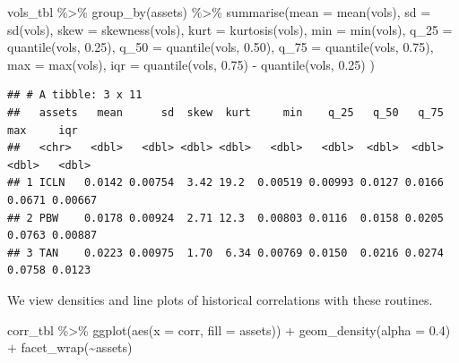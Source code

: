 \documentclass{article}
\newenvironment{Shaded}{\begin{snugshade}}{\end{snugshade}}
\newcommand{\AttributeTok}[1]{\textcolor[rgb]{0.77,0.63,0.00}{#1}}
\newcommand{\FloatTok}[1]{\textcolor[rgb]{0.00,0.00,0.81}{#1}}
\newcommand{\FunctionTok}[1]{\textcolor[rgb]{0.00,0.00,0.00}{#1}}
\newcommand{\NormalTok}[1]{#1}
\newcommand{\SpecialCharTok}[1]{\textcolor[rgb]{0.00,0.00,0.00}{#1}}
\begin{document}
\begin{Shaded}
\begin{Highlighting}[]
\NormalTok{vols\_tbl }\SpecialCharTok{\%\textgreater{}\%} \FunctionTok{group\_by}\NormalTok{(assets) }\SpecialCharTok{\%\textgreater{}\%} 
  \FunctionTok{summarise}\NormalTok{(}\AttributeTok{mean =} \FunctionTok{mean}\NormalTok{(vols), }
            \AttributeTok{sd =} \FunctionTok{sd}\NormalTok{(vols), }
            \AttributeTok{skew =} \FunctionTok{skewness}\NormalTok{(vols), }
            \AttributeTok{kurt =} \FunctionTok{kurtosis}\NormalTok{(vols), }
            \AttributeTok{min =} \FunctionTok{min}\NormalTok{(vols), }
            \AttributeTok{q\_25 =} \FunctionTok{quantile}\NormalTok{(vols, }\FloatTok{0.25}\NormalTok{), }
            \AttributeTok{q\_50 =} \FunctionTok{quantile}\NormalTok{(vols, }\FloatTok{0.50}\NormalTok{), }
            \AttributeTok{q\_75 =} \FunctionTok{quantile}\NormalTok{(vols, }\FloatTok{0.75}\NormalTok{), }
            \AttributeTok{max =} \FunctionTok{max}\NormalTok{(vols),}
            \AttributeTok{iqr =} \FunctionTok{quantile}\NormalTok{(vols, }\FloatTok{0.75}\NormalTok{) }\SpecialCharTok{{-}} \FunctionTok{quantile}\NormalTok{(vols, }\FloatTok{0.25}\NormalTok{)}
\NormalTok{            )}
\end{Highlighting}
\end{Shaded}

\begin{verbatim}
## # A tibble: 3 x 11
##   assets   mean      sd  skew  kurt     min    q_25   q_50   q_75    max     iqr
##   <chr>   <dbl>   <dbl> <dbl> <dbl>   <dbl>   <dbl>  <dbl>  <dbl>  <dbl>   <dbl>
## 1 ICLN   0.0142 0.00754  3.42 19.2  0.00519 0.00993 0.0127 0.0166 0.0671 0.00667
## 2 PBW    0.0178 0.00924  2.71 12.3  0.00803 0.0116  0.0158 0.0205 0.0763 0.00887
## 3 TAN    0.0223 0.00975  1.70  6.34 0.00769 0.0150  0.0216 0.0274 0.0758 0.0123
\end{verbatim}

We view densities and line plots of historical correlations with these
routines.

\begin{Shaded}
\begin{Highlighting}[]
\NormalTok{corr\_tbl }\SpecialCharTok{\%\textgreater{}\%} \FunctionTok{ggplot}\NormalTok{(}\FunctionTok{aes}\NormalTok{(}\AttributeTok{x =}\NormalTok{ corr, }\AttributeTok{fill =}\NormalTok{ assets)) }\SpecialCharTok{+} 
  \FunctionTok{geom\_density}\NormalTok{(}\AttributeTok{alpha =} \FloatTok{0.4}\NormalTok{) }\SpecialCharTok{+} 
  \FunctionTok{facet\_wrap}\NormalTok{(}\SpecialCharTok{\textasciitilde{}}\NormalTok{assets)}
\end{Highlighting}
\end{Shaded}
\end{document}
